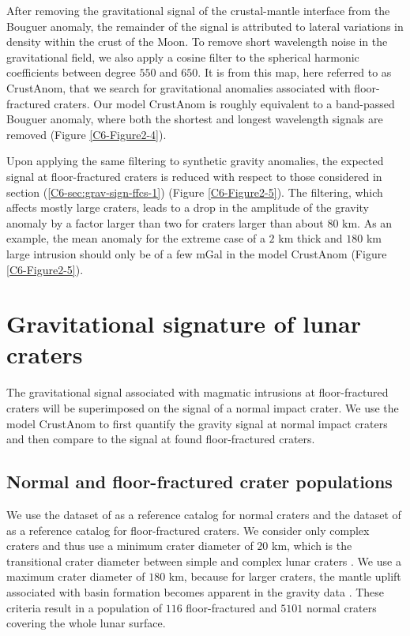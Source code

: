 After  removing   the  gravitational  signal  of   the  crustal-mantle
interface from  the Bouguer  anomaly, the remainder  of the  signal is
attributed to  lateral variations in  density within the crust  of the
Moon. To remove short wavelength  noise in the gravitational field, we
also  apply a  cosine filter  to the  spherical harmonic  coefficients
between degree $550$ and $650$. It  is from this map, here referred to
as CrustAnom,  that we  search for gravitational  anomalies associated
with  floor-fractured   craters.   Our  model  CrustAnom   is  roughly
equivalent to a  band-passed Bouguer anomaly, where  both the shortest
and longest wavelength signals are removed (Figure \ref{C6-Figure2-4}).

Upon applying the  same filtering to synthetic  gravity anomalies, the
expected signal at floor-fractured craters  is reduced with respect to
those  considered  in   section  (\ref{C6-sec:grav-sign-ffcs-1})  (Figure
\ref{C6-Figure2-5}).  The filtering, which  affects mostly large craters,
leads to a  drop in the amplitude  of the gravity anomaly  by a factor
larger than two for craters larger than about $80$ km.  As an example,
the mean anomaly for  the extreme case of a $2$ km  thick and $180$ km
large intrusion  should only be of  a few mGal in  the model CrustAnom
(Figure \ref{C6-Figure2-5}).


\section{Gravitational signature of lunar craters}
\label{C6-sec:grav-sign-lunar}

The  gravitational  signal  associated  with  magmatic  intrusions  at
floor-fractured craters will be superimposed on the signal of a normal
impact  crater.  We  use the  model  CrustAnom to  first quantify  the
gravity signal at normal impact craters and then compare to the signal
at found floor-fractured craters.
 
\subsection{Normal and floor-fractured crater populations}
\label{C6-sec:unmod-floor-fract}
 
We use the  dataset of \citet{Head:2010fy} as a  reference catalog for
normal  craters  and  the   dataset  of  \citet{Jozwiak:2012dq}  as  a
reference  catalog  for  floor-fractured craters.   We  consider  only
complex craters  and thus use  a minimum  crater diameter of  $20$ km,
which is the  transitional crater diameter between  simple and complex
lunar  craters  \citep{Pike:1974ux,Pike:1980eh}.   We  use  a  maximum
crater diameter  of $180$ km,  because for larger craters,  the mantle
uplift associated with basin formation becomes apparent in the gravity
data \citep{Melosh:2013cz}.  These criteria  result in a population of
$116$  floor-fractured and  $5101$ normal  craters covering  the whole
lunar surface.
	
